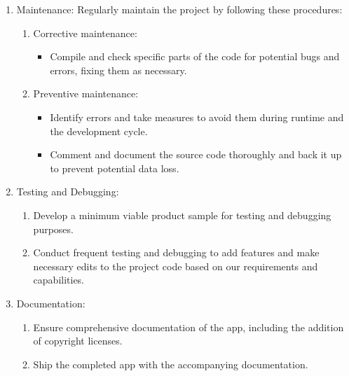 \begin{enumerate}
\begin{enumerate}
		\end{enumerate}
	
	\item Maintenance:
	Regularly maintain the project by following these procedures:
		\begin{enumerate}
			
			\item Corrective maintenance:
				\begin{itemize}
					\item Compile and check specific parts of the code for potential bugs and errors, fixing them as necessary.
				\end{itemize}
			
			\item  Preventive maintenance:
				\begin{itemize}
					
					\item Identify errors and take measures to avoid them during runtime and the development cycle.
					\item Comment and document the source code thoroughly and back it up to prevent potential data loss.
					
					
				\end{itemize}
		\end{enumerate}
	\pagebreak
	\item Testing and Debugging:
		\begin{enumerate}
			
			\item Develop a minimum viable product sample for testing and debugging purposes.
			\item Conduct frequent testing and debugging to add features and make necessary edits to the project code based on our requirements and capabilities.
			
		\end{enumerate}
	\item Documentation:
		\begin{enumerate}
			\item Ensure comprehensive documentation of the app, including the addition of copyright licenses.
			\item Ship the completed app with the accompanying documentation.
		\end{enumerate}
\end{enumerate}




